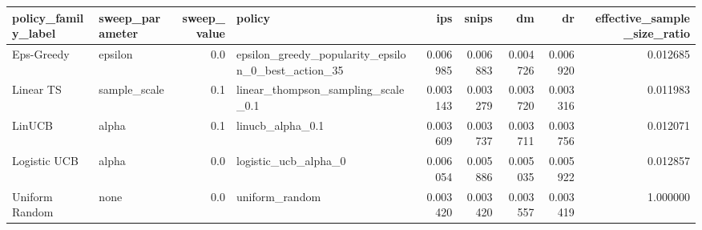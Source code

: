 \begin{tabular}{llrlrrrrr}
\toprule
policy\_family\_label & sweep\_parameter &  sweep\_value &                                             policy &      ips &    snips &       dm &       dr &  effective\_sample\_size\_ratio \\
\midrule
         Eps-Greedy &         epsilon &          0.0 & epsilon\_greedy\_popularity\_epsilon\_0\_best\_action\_35 & 0.006985 & 0.006883 & 0.004726 & 0.006920 &                     0.012685 \\
          Linear TS &    sample\_scale &          0.1 &                 linear\_thompson\_sampling\_scale\_0.1 & 0.003143 & 0.003279 & 0.003720 & 0.003316 &                     0.011983 \\
             LinUCB &           alpha &          0.1 &                                   linucb\_alpha\_0.1 & 0.003609 & 0.003737 & 0.003711 & 0.003756 &                     0.012071 \\
       Logistic UCB &           alpha &          0.0 &                               logistic\_ucb\_alpha\_0 & 0.006054 & 0.005886 & 0.005035 & 0.005922 &                     0.012857 \\
     Uniform Random &            none &          0.0 &                                     uniform\_random & 0.003420 & 0.003420 & 0.003557 & 0.003419 &                     1.000000 \\
\bottomrule
\end{tabular}
